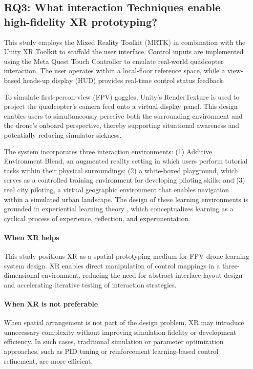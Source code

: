 \subsection{RQ3: What interaction Techniques enable high-fidelity XR prototyping?}

This study employs the Mixed Reality Toolkit (MRTK) in combination with the Unity XR Toolkit to scaffold the user interface. Control inputs are implemented using the Meta Quest Touch Controller to emulate real-world quadcopter interaction. The user operates within a local-floor reference space, while a view-based heads-up display (HUD) provides real-time control status feedback.

To simulate first-person-view (FPV) goggles, Unity's RenderTexture is used to project the quadcopter's camera feed onto a virtual display panel. This design enables users to simultaneously perceive both the surrounding environment and the drone's onboard perspective, thereby supporting situational awareness and potentially reducing simulator sickness.

The system incorporates three interaction environments: (1) Additive Environment Blend, an augmented reality setting in which users perform tutorial tasks within their physical surroundings; (2) a white-boxed playground, which serves as a controlled training environment for developing piloting skills; and (3) real city piloting, a virtual geographic environment that enables navigation within a simulated urban landscape. The design of these learning environments is grounded in experiential learning theory \parencite{kolb1984}, which conceptualizes learning as a cyclical process of experience, reflection, and experimentation.

\paragraph{When XR helps}

This study positions XR as a spatial prototyping medium for FPV drone learning system design. XR enables direct manipulation of control mappings in a three-dimensional environment, reducing the need for abstract interface layout design and accelerating iterative testing of interaction strategies.

\paragraph{When XR is not preferable}

When spatial arrangement is not part of the design problem, XR may introduce unnecessary complexity without improving simulation fidelity or development efficiency. In such cases, traditional simulation or parameter optimization approaches, such as PID tuning or reinforcement learning-based control refinement, are more efficient.
